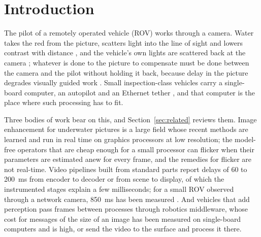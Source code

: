 \section{Introduction}\label{sec:introduction}

The pilot of a remotely operated vehicle (ROV) works through a
camera. Water takes
the red from the picture, scatters light into the line of sight and
lowers contrast
with distance \cite{jaffe1990,schettini2010}, and the vehicle's own lights are
scattered back at the camera \cite{abdullah2026}; whatever is done to
the picture to
compensate must be done between the camera and the pilot without
holding it back,
because delay in the picture degrades visually guided work
\cite{mackenzie1993,nankaku2022,chen2007}. Small inspection-class
vehicles carry a
single-board computer, an autopilot and an Ethernet tether
\cite{vonbenzon2022}, and
that computer is the place where such processing has to fit.

Three bodies of work bear on this, and Section~\ref{sec:related}
reviews them. Image
enhancement for underwater pictures is a large field whose recent
methods are learned
and run in real time on graphics processors at low resolution; the model-free
operators that are cheap enough for a small processor can flicker when their
parameters are estimated anew for every frame, and the remedies for
flicker are not real-time.
Video pipelines built from standard parts report delays of 60 to
200~ms from encoder
to decoder or from scene to display, of which the instrumented stages
explain a few
milliseconds; for a small ROV observed through a network camera, 850~ms has been
measured \cite{kaknjo2018}. And vehicles that add perception pass frames between
processes through robotics middleware, whose cost for messages of the size of an
image has been measured on single-board computers and is high, or
send the video to
the surface and process it there.

